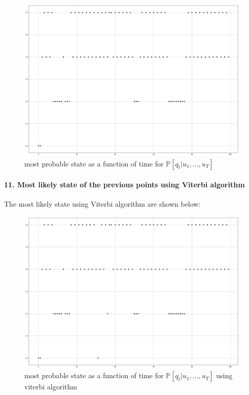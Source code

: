 \documentclass[11pt]{article}
\numberwithin{figure}{section} %
\begin{document}
\begin{figure}[H]
\centering
\includegraphics[width=1\linewidth]{images/q10}
\caption{most probable state as a function of time for $\mathbb{P}[q_t | u_1, \hdots, u_{T}]$}
\label{fig:prob_state}
\end{figure}

\paragraph{11. Most likely state of the previous points using Viterbi algorithm}
The most likely state using Viterbi algorithm are shown below:

\begin{figure}[H]
\centering
\includegraphics[width=1\linewidth]{images/q11}
\caption{most probable state as a function of time for $\mathbb{P}[q_t | u_1, \hdots, u_{T}]$ using viterbi algorithm}
\label{fig:prob_state_vit}
\end{figure}
\end{document}
